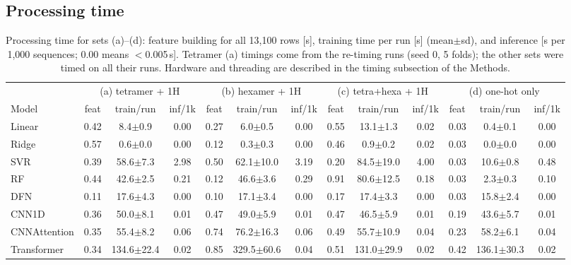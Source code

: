 \subsection{Processing time}
\begin{table}[H]\centering\scriptsize\setlength{\tabcolsep}{2.5pt}
\caption{Processing time for sets (a)--(d): feature building for all 13{,}100 rows [s], training time per run [s] (mean$\pm$sd), and inference [s per 1{,}000 sequences; 0.00 means $<$0.005\,s]. Tetramer (a) timings come from the re-timing runs (seed 0, 5 folds); the other sets were timed on all their runs. Hardware and threading are described in the timing subsection of the Methods.}
\begin{tabular}{l|ccc|ccc|ccc|ccc}\toprule
& \multicolumn{3}{c|}{(a) tetramer + 1H} & \multicolumn{3}{c|}{(b) hexamer + 1H} & \multicolumn{3}{c|}{(c) tetra+hexa + 1H} & \multicolumn{3}{c}{(d) one-hot only}\\
Model & feat & train/run & inf/1k & feat & train/run & inf/1k & feat & train/run & inf/1k & feat & train/run & inf/1k\\\midrule
Linear & 0.42 & 8.4$\pm$0.9 & 0.00 & 0.27 & 6.0$\pm$0.5 & 0.00 & 0.55 & 13.1$\pm$1.3 & 0.02 & 0.03 & 0.4$\pm$0.1 & 0.00 \\
Ridge & 0.57 & 0.6$\pm$0.0 & 0.00 & 0.12 & 0.3$\pm$0.3 & 0.00 & 0.46 & 0.9$\pm$0.2 & 0.02 & 0.03 & 0.0$\pm$0.0 & 0.00 \\
SVR & 0.39 & 58.6$\pm$7.3 & 2.98 & 0.50 & 62.1$\pm$10.0 & 3.19 & 0.20 & 84.5$\pm$19.0 & 4.00 & 0.03 & 10.6$\pm$0.8 & 0.48 \\
RF & 0.44 & 42.6$\pm$2.5 & 0.21 & 0.12 & 46.6$\pm$3.6 & 0.29 & 0.91 & 80.6$\pm$12.5 & 0.18 & 0.03 & 2.3$\pm$0.3 & 0.10 \\
DFN & 0.11 & 17.6$\pm$4.3 & 0.00 & 0.10 & 17.1$\pm$3.4 & 0.00 & 0.17 & 17.4$\pm$3.3 & 0.00 & 0.03 & 15.8$\pm$2.4 & 0.00 \\
CNN1D & 0.36 & 50.0$\pm$8.1 & 0.01 & 0.47 & 49.0$\pm$5.9 & 0.01 & 0.47 & 46.5$\pm$5.9 & 0.01 & 0.19 & 43.6$\pm$5.7 & 0.01 \\
CNNAttention & 0.35 & 55.4$\pm$8.2 & 0.06 & 0.74 & 76.2$\pm$16.3 & 0.06 & 0.49 & 55.7$\pm$10.9 & 0.04 & 0.23 & 58.2$\pm$6.1 & 0.04 \\
Transformer & 0.34 & 134.6$\pm$22.4 & 0.02 & 0.85 & 329.5$\pm$60.6 & 0.04 & 0.51 & 131.0$\pm$29.9 & 0.02 & 0.42 & 136.1$\pm$30.3 & 0.02 \\
\bottomrule\end{tabular}\label{tab:time}\end{table}
